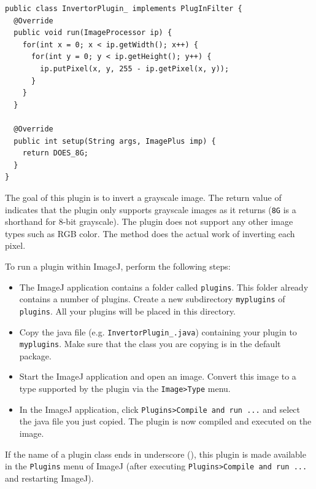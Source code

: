 \documentclass{book}
\begin{document}
\begin{lstlisting}
public class InvertorPlugin_ implements PlugInFilter {
  @Override
  public void run(ImageProcessor ip) {
    for(int x = 0; x < ip.getWidth(); x++) {
      for(int y = 0; y < ip.getHeight(); y++) {
        ip.putPixel(x, y, 255 - ip.getPixel(x, y));
      }
    }
  }
  
  @Override
  public int setup(String args, ImagePlus imp) {
    return DOES_8G;  
  }
}
\end{lstlisting}

The goal of this plugin is to invert a grayscale image. The return value of  indicates that the plugin only supports grayscale images as it returns  (\texttt{8G} is a shorthand for 8-bit grayscale). The plugin does not support any other image types such as RGB color. The  method does the actual work of inverting each pixel.

To run a plugin within ImageJ, perform the following steps:
\begin{itemize}
  \item The ImageJ application contains a folder called \texttt{plugins}. This folder already contains a number of plugins. Create a new subdirectory \texttt{myplugins} of \texttt{plugins}. All your plugins will be placed in this directory.
  \item Copy the java file (e.g. \texttt{InvertorPlugin\_.java}) containing your plugin to \texttt{myplugins}. Make sure that the class you are copying is in the default package.
  \item Start the ImageJ application and open an image. Convert this image to a type supported by the plugin via the \texttt{Image>Type} menu.
  \item In the ImageJ application, click \texttt{Plugins>Compile and run ...} and select the java file you just copied. The plugin is now compiled and executed on the image. 
\end{itemize}

If the name of a plugin class ends in underscore (\co{\_}), this plugin is made available in the \texttt{Plugins} menu of ImageJ (after executing \texttt{Plugins>Compile and run ...} and restarting ImageJ).
\end{document}
